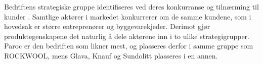 \begin{table}[ht]
\centering
{}
\caption{Produktegenskaper}
\label{produktegenskaper}
\end{table}
\indent \newline
Bedriftens strategiske gruppe identifiseres ved deres konkurranse og tilnærming til kunder \cite[s.~88]{FjeldstadogLunnan2018}. Samtlige aktører i markedet konkurrerer om de samme kundene, som i hovedsak er større entreprenører og byggevarekjeder. Derimot gjør produktegenskapene det naturlig å dele aktørene inn i to ulike strategigrupper. Paroc er den bedriften som likner mest, og plasseres derfor i samme gruppe som ROCKWOOL, mens Glava, Knauf og Sundolitt plasseres i en annen.
 
